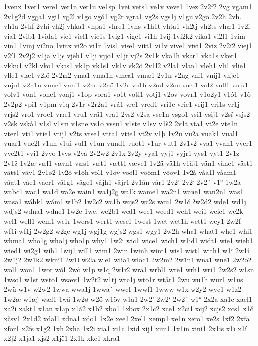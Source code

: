 1venx
1ver1
vere1
ver1n
ver1u
ve1sp
1vet
vets1
ve1v
veve1
1vez
2v2f2
2vg
vgam1
2v1g2d
vgga1
vgi1
vg2l
v1go
vgó1
vg2r
vgra1
vg2s
vgs1j
v1gu
v2gö
2v2h
2vh.
vh1a
2vhf
2vhi
vh2j
vhka1
vhpa1
vhre1
1vhs
v1h1t
vhta1
vh2tj
vh2ts
vhæ1
1v2i
via1
2vib1
1vida1
vie1
viel1
vie1s
1vig1
vige1
vi1h
1vij
1vi2k2
vika1
vi2l1
1vim
vin1
1vinj
vi2no
1vinx
vi2o
vi1r
1vis1
vise1
vitt1
vi1v
vive1
vivi1
2viz
2v2ï2
vïej1
v2í1
2v2j2
v1ja
v1je
vjeh1
v1ji
vjjo1
v1jr
vj2s
2v1k
vka1h
vkar1
vka1s
vker1
vkku1
v2kl
vko1
vkos1
vk1p
vk1s1
vk1v
vk2ö
2v1l2
v2la1
vlan1
vleh1
vli1
vlie1
vlle1
vlæ1
v2lö
2v2m2
vma1
vma1n
vmea1
vmæ1
2v1n
v2ng
vni1
vnij1
vnje1
vnjo1
v2n1n
vnne1
vnni1
v2ns
v2nö
1v2o
vo1b
v2od
v2oe
voer1
vol2
voll1
volu1
volv1
von1
vone1
vonj1
v1op
vora1
vo1t
voti1
votj1
v2ov
vovn1
v1o2y1
v1ó1
v1ò
2v2p2
vpi1
v1pm
v1q
2v1r
v2r2a1
vrá1
vre1
vred1
vri1c
vrie1
vrij1
vri1s
vr1j
vrjs2
vro1
vroe1
vrre1
vru1
vrä1
vrå1
2vs2
v2sa
vse1n
vsgo1
vsi1
vsij1
v2sï
vsjs2
v2sk
vskå1
v1sl
v1sm
v1sne
vs1o
vssu1
v1ste
v1sv
v1š2
2v1t
vta1
vt2e
vte1n
vter1
vti1
vtie1
vtij1
v2ts
vtse1
vtta1
vtte1
vt2v
v1þ
1v2u
vu2a
vuak1
vual1
vuar1
vue2l
v1uh
v1ui
vul1
v1un
vund1
vuot1
v1ur
vut1
2v1v2
vva1
vvan1
vver1
vve2t1
vvi1
2vvo
1vvs
v2vå
2v2w2
2v1x
2v2y
vya1
vyj1
vyjr1
vys1
vyt1
2v1z
2v1ž
1v2æ
væl1
værn1
væs1
væt1
vætt1
væve1
1v2ä
vä1h
v1äj1
vän1
väne1
väst1
vätt1
väv1
2v1ø2
1v2ö
v1öh
völ1
v1öv
vööl1
vööm1
vööv1
1v2å
våa1l
våam1
våat1
våe1
våer1
vå1g1
våge1
våjh1
våjr1
2v1ån
vår1
2v2'
2v2`
2v2´
v1°
1w2a
wabc1
wac1
wa1d
wa2e
wain1
wa1j2g
wa1k
wame1
wa2n1
wane1
wan2n1
was1
wasa1
wáhk1
wám1
w1b2
1w2c2
wc1b
wcjs2
wc2s
wcu1
2w1č
2w2d2
wde1
wd1j
wdjs2
wdna1
wdne1
1w2e
1we.
we2b1
wed1
wee1
weed1
weh1
wei1
weic1
we2k
wel1
well1
wem1
we1r
1wers1
wert1
wese1
1west
1wet
wet1h
wett1
wey1
2w2f
wf1i
wf1j
2w2g2
w2ge
wg1j
wgj1g
wgjs2
wgs1
wgy1
2w2h
wha1
what1
whe1
whi1
whma1
who1g
who1j
who1p
why1
1w2i
wic1
wice1
wich1
w1id1
widt1
wie1
wieb1
wied1
wi2g1
wih1
1wij1
will1
wim1
2win
1winh
wint1
wis1
wist1
with1
w1ï
2w1í
2w1j2
2w1k2
wkni1
2w1l
w2la
wle1
wlia1
wloc1
2w2m2
2w1n1
wna1
wne1
2w2o2
wol1
won1
1wor
wó1
2wò
w1p
w1q
2w1r2
wra1
wrbl1
wre1
wrh1
wri1
2w2s2
w1sn
1wso1
w1st
wsto1
wsæv1
1w2t2
w1tj
wto1j
wto1r
wtår1
2wu
wu1h
wur1
w1us
2wü
w1v
w2w2
1wwa
wwa1j
1wwa´
wwc1
1wwf1
1www
w1x
w2y2
wyc1
w1z2
1w2æ
w1æj
wæl1
1wä
1w2ø
w2ö
w1öv
w1å1
2w2'
2w2`
2w2´
w1°
2x2a
xa1c
xael1
xa2i
xakt1
x1an
x1ap
x1á2
x1b2
xbo1
1xbox
2x1c2
xce1
x2ci1
xcj2
xcjs2
xcs1
x1č
xčsv1
2x1d2
xdal1
xdna1
xdo1
1x2e
xee1
2xel1
xemp1
xe1n
xero1
xe2s
1xf2
2xfa
xfor1
x2fs
x1g2
1xh
2xha
1x2i
xia1
xi1c
1xid
xij1
xim1
1x1in
xini1
2x1is
x1ï
x1í
x2j2
x1ja1
xjs2
x1jö1
2x1k
xke1
xkra1
